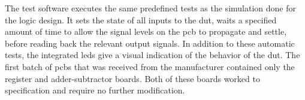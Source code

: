 The test software executes the same predefined tests as the simulation done for the logic design. It sets the state of all inputs to the \ac{dut}, waits a specified amount of time to allow the signal levels on the \ac{pcb} to propagate and settle, before reading back the relevant output signals. In addition to these automatic tests, the integrated \acp{led} give a visual indication of the behavior of the \ac{dut}. The first batch of \acp{pcb} that was received from the manufacturer contained only the register and adder-subtractor boards. Both of these boards worked to specification and require no further modification.
